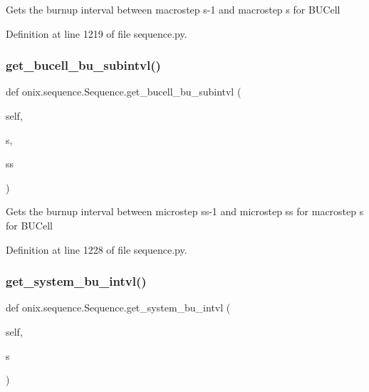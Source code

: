 \begin{DoxyVerb}Gets the burnup interval between macrostep s-1 and macrostep s for BUCell\end{DoxyVerb}
 

Definition at line 1219 of file sequence.\+py.

\mbox{\label{classonix_1_1sequence_1_1Sequence_a6732fe610abc6a483d990857c9be7e92}} 
\subsubsection{\texorpdfstring{get\+\_\+bucell\+\_\+bu\+\_\+subintvl()}{get\_bucell\_bu\_subintvl()}}
{\footnotesize\ttfamily def onix.\+sequence.\+Sequence.\+get\+\_\+bucell\+\_\+bu\+\_\+subintvl (\begin{DoxyParamCaption}\item[{}]{self,  }\item[{}]{s,  }\item[{}]{ss }\end{DoxyParamCaption})}

\begin{DoxyVerb}Gets the burnup interval between microstep ss-1 and microstep ss for macrostep s for BUCell\end{DoxyVerb}
 

Definition at line 1228 of file sequence.\+py.

\mbox{\label{classonix_1_1sequence_1_1Sequence_a99650e5369f6b233da5086cb551dc25c}} 
\subsubsection{\texorpdfstring{get\+\_\+system\+\_\+bu\+\_\+intvl()}{get\_system\_bu\_intvl()}}
{\footnotesize\ttfamily def onix.\+sequence.\+Sequence.\+get\+\_\+system\+\_\+bu\+\_\+intvl (\begin{DoxyParamCaption}\item[{}]{self,  }\item[{}]{s }\end{DoxyParamCaption})}

